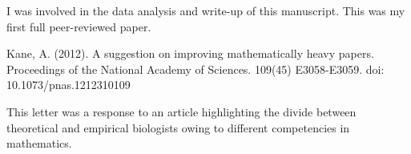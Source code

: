 \noindent
	I was involved in the data analysis and write-up of this manuscript. This was my first full peer-reviewed paper. \\
\begin{singlespace}
Kane, A. (2012). A suggestion on improving mathematically heavy papers. Proceedings of the National Academy of Sciences. 109(45) E3058-E3059. doi: 10.1073/pnas.1212310109 \\
\end{singlespace}
	\noindent
	This letter was a response to an article highlighting the divide between theoretical and empirical                   biologists owing to different competencies in mathematics. 

